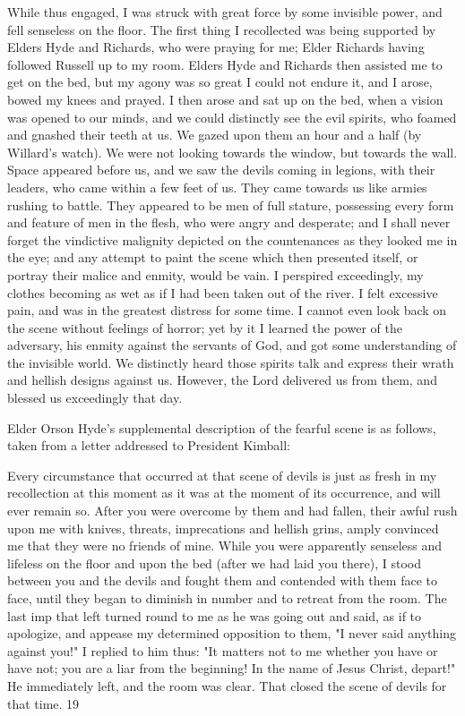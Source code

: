 While thus engaged, I was struck with great force by some invisible power, and fell senseless
on the floor. The first thing I recollected was being supported by Elders Hyde and Richards,
who were praying for me; Elder Richards having followed Russell up to my room. Elders
Hyde and Richards then assisted me to get on the bed, but my agony was so great I could not
endure it, and I arose, bowed my knees and prayed. I then arose and sat up on the bed, when
a vision was opened to our minds, and we could distinctly see the evil spirits, who foamed
and gnashed their teeth at us. We gazed upon them an hour and a half (by Willard's watch).
We were not looking towards the window, but towards the wall. Space appeared before us,
and we saw the devils coming in legions, with their leaders, who came within a few feet of
us. They came towards us like armies rushing to battle. They appeared to be men of full
stature, possessing every form and feature of men in the flesh, who were angry and
desperate; and I shall never forget the vindictive malignity depicted on the countenances as
they looked me in the eye; and any attempt to paint the scene which then presented itself, or
portray their malice and enmity, would be vain. I perspired exceedingly, my clothes
becoming as wet as if I had been taken out of the river. I felt excessive pain, and was in the
greatest distress for some time. I cannot even look back on the scene without feelings of
horror; yet by it I learned the power of the adversary, his enmity against the servants of God,
and got some understanding of the invisible world. We distinctly heard those spirits talk and
express their wrath and hellish designs against us. However, the Lord delivered us from
them, and blessed us exceedingly that day.

Elder Orson Hyde's supplemental description of the fearful scene is as follows, taken from a
letter addressed to President Kimball:

Every circumstance that occurred at that scene of devils is just as fresh in my recollection at
this moment as it was at the moment of its occurrence, and will ever remain so. After you
were overcome by them and had fallen, their awful rush upon me with knives, threats,
imprecations and hellish grins, amply convinced me that they were no friends of mine. While
you were apparently senseless and lifeless on the floor and upon the bed (after we had laid
you there), I stood between you and the devils and fought them and contended with them
face to face, until they began to diminish in number and to retreat from the room. The last
imp that left turned round to me as he was going out and said, as if to apologize, and appease
my determined opposition to them, "I never said anything against you!" I replied to him thus:
"It matters not to me whether you have or have not; you are a liar from the beginning! In the
name of Jesus Christ, depart!" He immediately left, and the room was clear. That closed the
scene of devils for that time. 19


